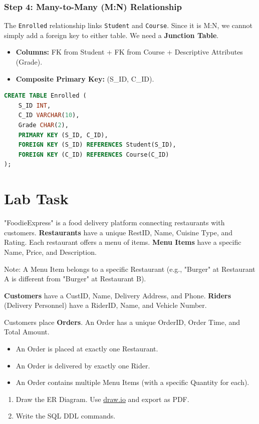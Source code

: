 \documentclass[12pt,a4paper]{article}
\begin{document}
\subsubsection{Step 4: Many-to-Many (M:N) Relationship}
The \texttt{Enrolled} relationship links \texttt{Student} and \texttt{Course}. Since it is M:N, we cannot simply add a foreign key to either table. We need a \textbf{Junction Table}.
\begin{itemize}
    \item \textbf{Columns:} FK from Student + FK from Course + Descriptive Attributes (Grade).
    \item \textbf{Composite Primary Key:} (S\_ID, C\_ID).
\end{itemize}
\begin{lstlisting}[language=SQL]
CREATE TABLE Enrolled (
    S_ID INT,
    C_ID VARCHAR(10),
    Grade CHAR(2),
    PRIMARY KEY (S_ID, C_ID),
    FOREIGN KEY (S_ID) REFERENCES Student(S_ID),
    FOREIGN KEY (C_ID) REFERENCES Course(C_ID)
);
\end{lstlisting}
\newpage

\section{Lab Task}
"FoodieExpress" is a food delivery platform connecting restaurants with customers.
\textbf{Restaurants} have a unique RestID, Name, Cuisine Type, and Rating. Each restaurant offers a menu of items.
\textbf{Menu Items} have a specific Name, Price, and Description.

Note: A Menu Item belongs to a specific Restaurant (e.g., "Burger" at Restaurant A is different from "Burger" at Restaurant B).

\textbf{Customers} have a CustID, Name, Delivery Address, and Phone.
\textbf{Riders} (Delivery Personnel) have a RiderID, Name, and Vehicle Number.

Customers place \textbf{Orders}. An Order has a unique OrderID, Order Time, and Total Amount.
\begin{itemize}
    \item An Order is placed at exactly one Restaurant.
    \item An Order is delivered by exactly one Rider.
    \item An Order contains multiple Menu Items (with a specific Quantity for each).
\end{itemize}

\begin{enumerate}
    \item Draw the ER Diagram. Use \href{https://www.draw.io}{draw.io} and export as PDF.
    \item Write the SQL DDL commands. 
\end{enumerate}
\end{document}

